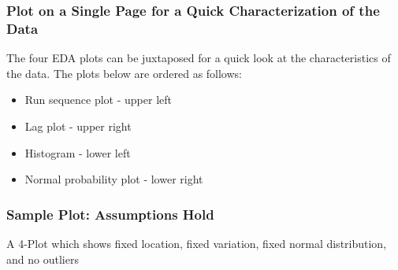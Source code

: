 \documentclass[]{book}
\providecommand{\tightlist}{%
  \setlength{\itemsep}{0pt}\setlength{\parskip}{0pt}}
\theoremstyle{definition}
\theoremstyle{definition}
\theoremstyle{definition}
\theoremstyle{remark}
\begin{document}
\subsubsection{Plot on a Single Page for a Quick Characterization of the
Data}\label{plot-on-a-single-page-for-a-quick-characterization-of-the-data}

The four EDA plots can be juxtaposed for a quick look at the
characteristics of the data. The plots below are ordered as follows:

\begin{itemize}
\tightlist
\item
  Run sequence plot - upper left
\item
  Lag plot - upper right
\item
  Histogram - lower left
\item
  Normal probability plot - lower right
\end{itemize}

\subsubsection{Sample Plot: Assumptions
Hold}\label{sample-plot-assumptions-hold}

A 4-Plot which shows fixed location, fixed variation, fixed normal
distribution, and no outliers
\end{document}
